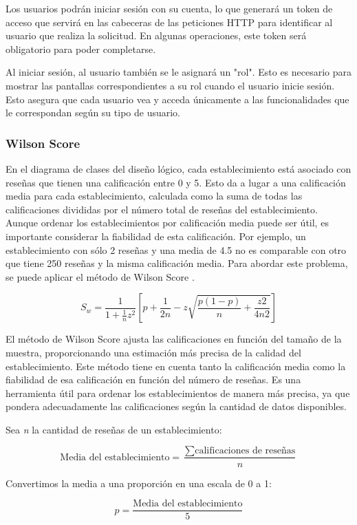 Los usuarios podrán iniciar sesión con su cuenta, lo que generará un token de acceso que servirá en las cabeceras de las peticiones HTTP para identificar al usuario que realiza la solicitud. En algunas operaciones, este token será obligatorio para poder completarse.

Al iniciar sesión, al usuario también se le asignará un "rol". Esto es necesario para mostrar las pantallas correspondientes a su rol cuando el usuario inicie sesión. Esto asegura que cada usuario vea y acceda únicamente a las funcionalidades que le correspondan según su tipo de usuario.

\subsubsection{Wilson Score}

En el diagrama de clases del diseño lógico, cada establecimiento está asociado con reseñas que tienen una calificación entre 0 y 5. Esto da a lugar a una calificación media para cada establecimiento, calculada como la suma de todas las calificaciones divididas por el número total de reseñas del establecimiento. Aunque ordenar los establecimientos por calificación media puede ser útil, es importante considerar la fiabilidad de esta calificación. Por ejemplo, un establecimiento con sólo 2 reseñas y una media de 4.5 no es comparable con otro que tiene 250 reseñas y la misma calificación media. Para abordar este problema, se puede aplicar el método de Wilson Score \cite{talton}.

\[ S_w = \frac{1}{{1 + \frac{1}{n} z^2}} \left[ p + \frac{1}{2n} - z\sqrt{\frac{p(1-p)}{n} + \frac{z2}{4n2}} \right] \]

El método de Wilson Score ajusta las calificaciones en función del tamaño de la muestra, proporcionando una estimación más precisa de la calidad del establecimiento. Este método tiene en cuenta tanto la calificación media como la fiabilidad de esa calificación en función del número de reseñas. Es una herramienta útil para ordenar los establecimientos de manera más precisa,  ya que pondera adecuadamente las calificaciones según la cantidad de datos disponibles.

Sea \textit{n} la cantidad de reseñas de un establecimiento:

\[
    \text{Media del establecimiento} = \frac{\sum \text{calificaciones de reseñas}}{n}
\]

Convertimos la media a una proporción en una escala de 0 a 1:

\[
    p = \frac{\text{Media del establecimiento}}{5}
\]

